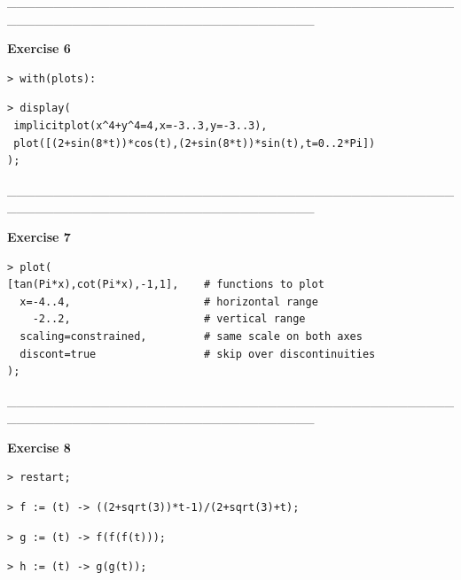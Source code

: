 \documentclass{article}
\begin{document}
\begin{Maple Normal}
\_\_\_\_\_\_\_\_\_\_\_\_\_\_\_\_\_\_\_\_\_\_\_\_\_\_\_\_\_\_\_\_\_\_\_\_\_\_\_\_\_\_\_\_\_\_\_\_\_\_\_\_\_\_\_\_\_\_\_\_\_\_\_\_\_\_\_\_\_\_\_\_\_\_\_\_\_\_\_\_\_
\end{Maple Normal}
\begin{Maple Heading 2}
\textbf{Exercise 6}
\end{Maple Heading 2}
\begin{lstlisting}
> with(plots):
\end{lstlisting}
\begin{lstlisting}
> display(
 implicitplot(x^4+y^4=4,x=-3..3,y=-3..3),
 plot([(2+sin(8*t))*cos(t),(2+sin(8*t))*sin(t),t=0..2*Pi])
);
\end{lstlisting}
\begin{Maple Normal}
\_\_\_\_\_\_\_\_\_\_\_\_\_\_\_\_\_\_\_\_\_\_\_\_\_\_\_\_\_\_\_\_\_\_\_\_\_\_\_\_\_\_\_\_\_\_\_\_\_\_\_\_\_\_\_\_\_\_\_\_\_\_\_\_\_\_\_\_\_\_\_\_\_\_\_\_\_\_\_\_\_
\end{Maple Normal}
\begin{Maple Heading 2}
\textbf{Exercise 7}
\end{Maple Heading 2}
\begin{lstlisting}
> plot(
[tan(Pi*x),cot(Pi*x),-1,1],    # functions to plot
  x=-4..4,                     # horizontal range
    -2..2,                     # vertical range
  scaling=constrained,         # same scale on both axes
  discont=true                 # skip over discontinuities
);
\end{lstlisting}
\begin{Maple Normal}
\_\_\_\_\_\_\_\_\_\_\_\_\_\_\_\_\_\_\_\_\_\_\_\_\_\_\_\_\_\_\_\_\_\_\_\_\_\_\_\_\_\_\_\_\_\_\_\_\_\_\_\_\_\_\_\_\_\_\_\_\_\_\_\_\_\_\_\_\_\_\_\_\_\_\_\_\_\_\_\_\_
\end{Maple Normal}
\begin{Maple Heading 2}
\textbf{Exercise 8}
\end{Maple Heading 2}
\begin{lstlisting}
> restart;
\end{lstlisting}
\begin{lstlisting}
> f := (t) -> ((2+sqrt(3))*t-1)/(2+sqrt(3)+t);
\end{lstlisting}
\begin{lstlisting}
> g := (t) -> f(f(f(t)));
\end{lstlisting}
\begin{lstlisting}
> h := (t) -> g(g(t));
\end{lstlisting}
\end{document}
